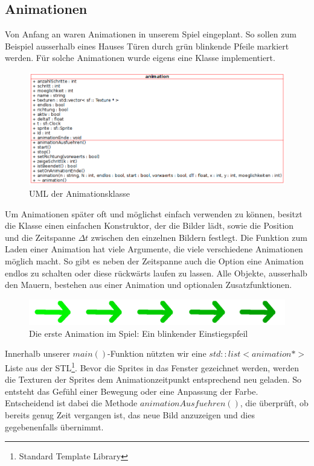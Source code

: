 \documentclass[11pt,a4paper]{scrbook}
\begin{document}
\subsection{Animationen}
Von Anfang an waren Animationen in unserem Spiel eingeplant. So sollen zum Beispiel ausserhalb eines Hauses
Türen durch grün blinkende Pfeile markiert werden. Für solche Animationen wurde eigens eine Klasse implementiert.
\begin{figure}[h]
    \centering
    \includegraphics[scale=0.6]{img/animation_uml.png}
    \caption{UML der Animationsklasse}
\end{figure}
Um Animationen später oft und möglichst einfach verwenden zu können, besitzt die Klasse einen einfachen Konstruktor,
der die Bilder lädt, sowie die Position und die Zeitspanne $\Delta t$ zwischen den einzelnen Bildern festlegt.
Die Funktion zum Laden einer Animation hat viele Argumente, die viele verschiedene Animationen möglich macht. So gibt es neben der Zeitspanne auch die Option eine Animation endlos zu schalten oder diese rückwärts laufen zu lassen. Alle Objekte, ausserhalb den Mauern, bestehen aus einer Animation und optionalen Zusatzfunktionen.
\begin{figure}[h]
    \centering
    \includegraphics[scale=0.3]{img/animation_pfeil.png}
    \caption{Die erste Animation im Spiel: Ein blinkender Einstiegspfeil}
\end{figure}
Innerhalb unserer $main()$-Funktion nützten wir eine $std::list<animation *>$ Liste aus der STL\footnote{Standard Template Library}.
Bevor die Sprites in das Fenster gezeichnet werden, werden die Texturen der Sprites dem Animationzeitpunkt entsprechend
neu geladen. So entsteht das Gefühl einer Bewegung oder eine Anpassung der Farbe. Entscheidend ist dabei die Methode
$animationAusfuehren()$, die überprüft, ob bereits genug Zeit vergangen ist, das neue Bild anzuzeigen und dies gegebenenfalls
übernimmt.
\end{document}
